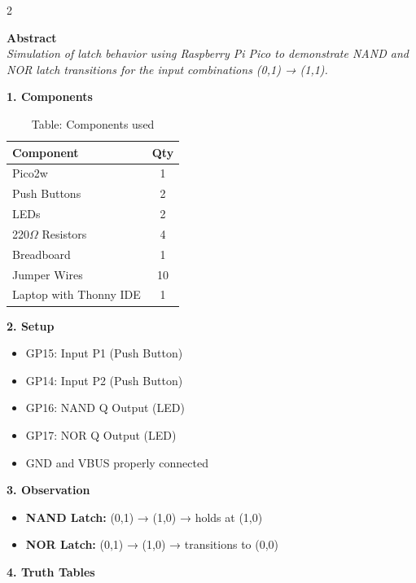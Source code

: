 \documentclass[12pt]{article}
\begin{document}
\begin{multicols}{2}

\noindent\textbf{Abstract} \\[0.5em]
\textit{Simulation of latch behavior using Raspberry Pi Pico to demonstrate NAND and NOR latch transitions for the input combinations (0,1) → (1,1).}

\vspace{1em}
\noindent\textbf{1. Components}
\begin{table}[H]
\small
\centering
\begin{tabular}{|p{4.2cm}|c|}
\hline
\textbf{Component} & \textbf{Qty} \\
\hline
Pico2w & 1 \\
Push Buttons & 2 \\
LEDs & 2 \\
220$\Omega$ Resistors & 4 \\
Breadboard & 1 \\
Jumper Wires & 10 \\
Laptop with Thonny IDE & 1 \\
\hline
\end{tabular}
\caption*{Table: Components used}
\end{table}

\vspace{1em}
\noindent\textbf{2. Setup}
\begin{itemize}
    \item GP15: Input P1 (Push Button)
    \item GP14: Input P2 (Push Button)
    \item GP16: NAND Q Output (LED)
    \item GP17: NOR Q Output (LED)
    \item GND and VBUS properly connected
\end{itemize}

\vspace{1em}
\noindent\textbf{3. Observation}
\begin{itemize}
    \item \textbf{NAND Latch:} (0,1) → (1,0) → holds at (1,0)
    \item \textbf{NOR Latch:} (0,1) → (1,0) → transitions to (0,0)
\end{itemize}

\end{multicols}

\vspace{1em}
\noindent\textbf{4. Truth Tables}
\vspace{1em}
\end{document}
